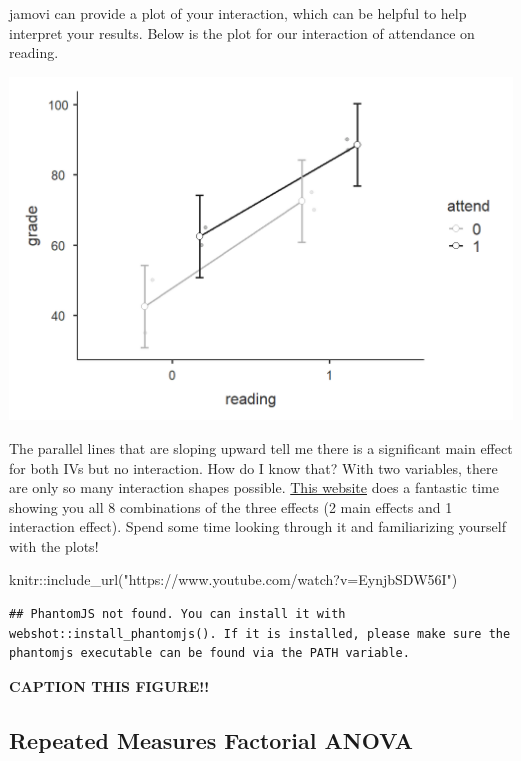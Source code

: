 \documentclass[
]{book}
\newenvironment{Shaded}{\begin{snugshade}}{\end{snugshade}}
\newcommand{\FunctionTok}[1]{\textcolor[rgb]{0.00,0.00,0.00}{#1}}
\newcommand{\NormalTok}[1]{#1}
\newcommand{\SpecialCharTok}[1]{\textcolor[rgb]{0.00,0.00,0.00}{#1}}
\newcommand{\StringTok}[1]{\textcolor[rgb]{0.31,0.60,0.02}{#1}}
\begin{document}
jamovi can provide a plot of your interaction, which can be helpful to help interpret your results. Below is the plot for our interaction of attendance on reading.

\includegraphics{images/06-factorial-anova/independent-factorial_plot.png}

The parallel lines that are sloping upward tell me there is a significant main effect for both IVs but no interaction. How do I know that? With two variables, there are only so many interaction shapes possible. \href{https://courses.washington.edu/smartpsy/interactions.htm}{This website} does a fantastic time showing you all 8 combinations of the three effects (2 main effects and 1 interaction effect). Spend some time looking through it and familiarizing yourself with the plots!

\begin{Shaded}
\begin{Highlighting}[]
\NormalTok{knitr}\SpecialCharTok{::}\FunctionTok{include\_url}\NormalTok{(}\StringTok{"https://www.youtube.com/watch?v=EynjbSDW56I"}\NormalTok{)}
\end{Highlighting}
\end{Shaded}

\begin{verbatim}
## PhantomJS not found. You can install it with webshot::install_phantomjs(). If it is installed, please make sure the phantomjs executable can be found via the PATH variable.
\end{verbatim}

\label{fig:unnamed-chunk-1}\textbf{CAPTION THIS FIGURE!!}

\hypertarget{repeated-measures-factorial-anova}{%
\subsection{Repeated Measures Factorial ANOVA}\label{repeated-measures-factorial-anova}}
\end{document}
